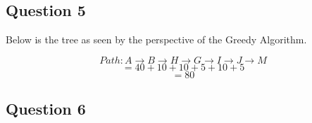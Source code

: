  \pagebreak

  \subsection{Question 5}

  Below is the tree as seen by the perspective of the Greedy Algorithm.

    $$Path: A \rightarrow B \rightarrow H \rightarrow G \rightarrow I \rightarrow J \rightarrow M $$
    $$ = 40 + 10 + 10 + 5 + 10 + 5$$
    $$ = 80 $$

  \bigskip

  \begin{flushleft}
    
  \end{flushleft}

  \pagebreak

  \subsection{Question 6}

  \begin{flushleft}
    
  \end{flushleft}
